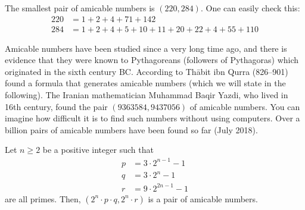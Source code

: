 \begin{example}
	The smallest pair of amicable numbers is $(220,284)$. One can easily check this:
	\begin{align*}
		220 &= 1 + 2 +  4 + 71 + 142\\
		284 &= 1 + 2 + 4 + 5 + 10 + 11 + 20 + 22 + 4 + 55 + 110
	\end{align*}
\end{example}

Amicable numbers have been studied since a very long time ago, and there is evidence that they were known to Pythagoreans (followers of Pythagoras) which originated in the sixth century BC. According to \textcite[Chapter I, Page $39$]{dickson_1952} Th\={a}bit ibn Qurra (826--901) found a formula that generates amicable numbers (which we will state in the following). The Iranian mathematician Muhammad Baqir Yazdi, who lived in 16th century, found the pair $(9363584, 9437056)$ of amicable numbers. You can imagine how difficult it is to find such numbers without using computers. Over a billion pairs of amicable numbers have been found so far (July 2018).

\begin{theorem}[Th\={a}bit ibn Qurra's Rule]
	Let $n\geq 2$ be a positive integer such that
	\begin{align*}
		p & = 3 \cdot 2^{n-1} - 1\\
		q & = 3 \cdot 2^{n} - 1\\
		r & = 9 \cdot 2^{2n - 1} - 1
	\end{align*}
	are all primes. Then, $(2^n\cdot p \cdot q,  2^n\cdot r)$ is a pair of amicable numbers.
\end{theorem}

